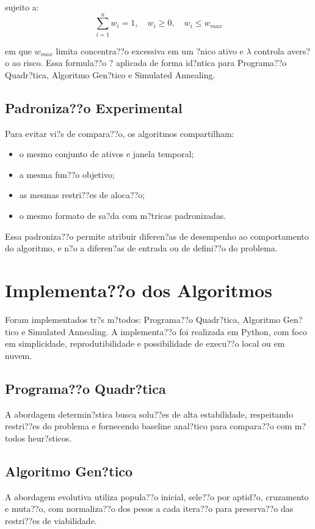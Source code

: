 ﻿\documentclass[
  12pt,
  oneside,
  a4paper,
  brazil
]{abntex2}
\begin{document}
sujeito a:
\[
\sum_{i=1}^{n}w_i=1, \quad w_i\geq 0, \quad w_i\leq w_{max}
\]

em que $w_{max}$ limita concentra??o excessiva em um ?nico ativo e $\lambda$ controla avers?o ao risco. Essa formula??o ? aplicada de forma id?ntica para Programa??o Quadr?tica, Algoritmo Gen?tico e Simulated Annealing.

\subsection{Padroniza??o Experimental}
Para evitar vi?s de compara??o, os algoritmos compartilham:
\begin{itemize}
  \item o mesmo conjunto de ativos e janela temporal;
  \item a mesma fun??o objetivo;
  \item as mesmas restri??es de aloca??o;
  \item o mesmo formato de sa?da com m?tricas padronizadas.
\end{itemize}

Essa padroniza??o permite atribuir diferen?as de desempenho ao comportamento do algoritmo, e n?o a diferen?as de entrada ou de defini??o do problema.

\section{Implementa??o dos Algoritmos}
Foram implementados tr?s m?todos: Programa??o Quadr?tica, Algoritmo Gen?tico e Simulated Annealing. A implementa??o foi realizada em Python, com foco em simplicidade, reprodutibilidade e possibilidade de execu??o local ou em nuvem.

\subsection{Programa??o Quadr?tica}
A abordagem determin?stica busca solu??es de alta estabilidade, respeitando restri??es do problema e fornecendo baseline anal?tico para compara??o com m?todos heur?sticos.

\subsection{Algoritmo Gen?tico}
A abordagem evolutiva utiliza popula??o inicial, sele??o por aptid?o, cruzamento e muta??o, com normaliza??o dos pesos a cada itera??o para preserva??o das restri??es de viabilidade.
\end{document}
